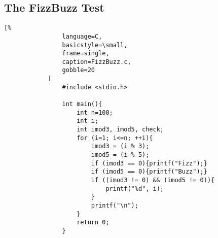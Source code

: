 \documentclass[crop=false,class=book,oneside]{standalone}
\begin{document}
        \subsection{The FizzBuzz Test}
            \begin{lstlisting}[%
                language=C,
                basicstyle=\small,
                frame=single,
                caption=FizzBuzz.c,
                gobble=20
            ]
                #include <stdio.h>

                int main(){
                    int n=100;
                    int i;
                    int imod3, imod5, check;
                    for (i=1; i<=n; ++i){
                        imod3 = (i % 3);
                        imod5 = (i % 5);
                        if (imod3 == 0){printf("Fizz");}
                        if (imod5 == 0){printf("Buzz");}
                        if ((imod3 != 0) && (imod5 != 0)){
                            printf("%d", i);
                        }
                        printf("\n");
                    }
                    return 0;
                }
            \end{lstlisting}
\end{document}
